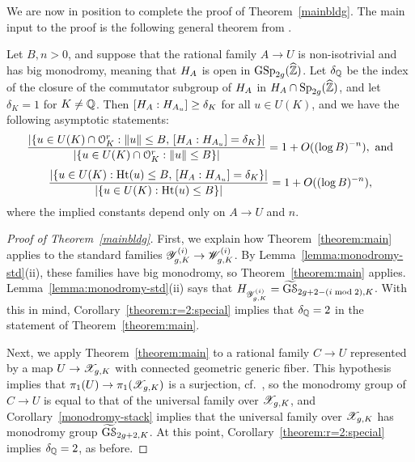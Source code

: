 We are now in position to complete the proof of Theorem~\ref{mainbldg}.
The main input to the proof is the following general theorem from \cite{landesman-swaminathan-tao-xu:rational-families}.
\begin{theorem}

	\label{theorem:main}
	Let $B, n > 0$, and suppose that the rational family $A \to U$ is non-isotrivial and has big monodromy, meaning that $\mono_A$ is open in $\GSp_{2g}(\zh)$. Let $\delta_\QQ$ be the index of the closure of the commutator subgroup of $\mono_A$ in $\mono_A \cap \Sp_{2g}(\zh)$, and let $\delta_K = 1$ for $K \neq \QQ$. Then $[\mono_A : \mono_{A_u}] \geq \delta_K$ for all $u \in U(K)$, and we have the following asymptotic statements:
			\[
				\frac{|\{u \in U(K) \cap \mathcal{O}_K^r : \lVert u \rVert \le B,\, [\mono_A : \mono_{A_u}] = \delta_K\}|}{|\{u \in U(K) \cap \mc{O}_K^r : \lVert u \rVert \le B\}|} = 1 + O((\log B)^{-n}), \text{ and}
			\]
\[
				\frac{|\{u \in U(K) : \on{Ht}(u) \leq B,\, [\mono_A : \mono_{A_u}] = \delta_K\}|}{|\{u \in U(K) : \on{Ht}(u) \le B\}|} = 1 + O((\log B)^{-n}),
			\]
	 where the implied constants depend only on $A \to U$ and $n$.
\end{theorem} 
\begin{proof}[Proof of Theorem~\ref{mainbldg}]
	First, we explain how Theorem~\ref{theorem:main} applies to the standard families $\standardFamily g i K \rightarrow \standardTarget g i K$. By Lemma~\ref{lemma:monodromy-std}(ii), these families have big monodromy, so Theorem~\ref{theorem:main} applies.  Lemma~\ref{lemma:monodromy-std}(ii) says that $H_{\standardFamily g i K} = \grouphypboth g {(i\bmod 2)} K$. With this in mind, Corollary~\ref{theorem:r=2:special} implies that $\delta_\bq = 2$ in the statement of Theorem~\ref{theorem:main}. 

	Next, we apply Theorem~\ref{theorem:main} to a rational family $C \rightarrow U$ represented by a map $U \to \hyperelliptic g K$ with connected geometric generic fiber. This hypothesis implies that $\pi_1(U) \to \pi_1(\hyperelliptic g K)$ is a surjection, cf.\ \cite[Corollary 5.3]{landesman-swaminathan-tao-xu:rational-families}, so the monodromy group of $C \to U$ is equal to that of the universal family over $\hyperelliptic g K$, and Corollary~\ref{monodromy-stack} implies that the universal family over $\hyperelliptic g K$ has monodromy group $\grouphyp g K$. At this point, Corollary~\ref{theorem:r=2:special} implies $\delta_\bq = 2$, as before. 
\end{proof}
